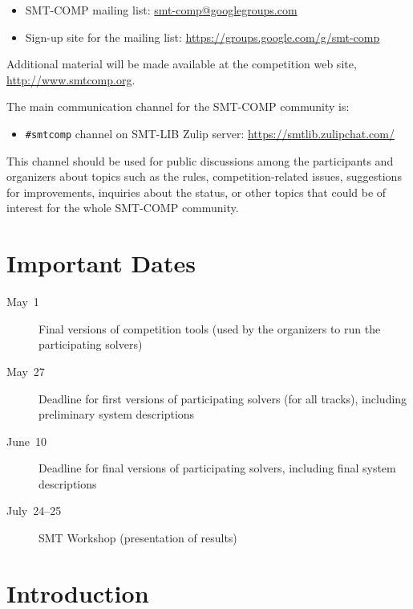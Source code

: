 \documentclass[12pt]{article}
\begin{document}
\begin{itemize}
\item SMT-COMP mailing list:
  \href{mailto:smt-comp@googlegroups.com}{\textrm{smt-comp@googlegroups.com}}
\item Sign-up site for the mailing list:
  \url{https://groups.google.com/g/smt-comp}
\end{itemize}

\noindent Additional material will be made available at the
competition web site, \url{http://www.smtcomp.org}.

\bigskip
\noindent The main communication channel for the SMT-COMP community is:
\begin{itemize}
\item \texttt{\#smtcomp} channel on SMT-LIB Zulip server:
\url{https://smtlib.zulipchat.com/}
\end{itemize}
This channel should be used for public discussions among the participants and
organizers about topics such as the rules, competition-related issues,
suggestions for improvements, inquiries about the status, or other topics that
could be of interest for the whole SMT-COMP community.


\newpage

\section{Important Dates}
\label{sec:important}


\begin{description}
    \item[May~1] Final versions of competition tools (used by the organizers to run the participating solvers)
    \item[May~27] Deadline for first versions of participating solvers (for all tracks), including preliminary system descriptions
    \item[June~10] Deadline for final versions of participating solvers, including final system descriptions
    \item[July~24--25] SMT Workshop (presentation of results)
\end{description}


\section{Introduction}
\end{document}
